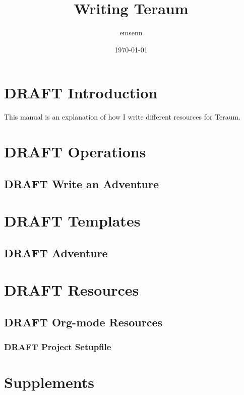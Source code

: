 \documentclass[11pt]{article}
\author{emsenn}
\date{\today}
\title{Writing Teraum}
\begin{document}
\maketitle
\begin{basic-config}
\end{basic-config}
\begin{export-options}
\end{export-options}
\begin{macros}
\end{macros}
\setcounter{tocdepth}{1}
\tableofcontents
{}
\section*{{\bfseries\sffamily DRAFT} Introduction}
\label{sec:org0ef1888}
This manual is an explanation of how I write different
resources for Teraum.
\section*{{\bfseries\sffamily DRAFT} Operations}
\label{sec:org59ce58a}
\subsection*{{\bfseries\sffamily DRAFT} Write an Adventure}
\label{sec:org27db6bd}
\section*{{\bfseries\sffamily DRAFT} Templates}
\label{sec:org3cf9a56}
\subsection*{{\bfseries\sffamily DRAFT} Adventure}
\label{sec:org5ee9cf9}
\section*{{\bfseries\sffamily DRAFT} Resources}
\label{sec:org36d332d}
\subsection*{{\bfseries\sffamily DRAFT} Org-mode Resources}
\label{sec:orgbbd70fe}
\subsubsection*{{\bfseries\sffamily DRAFT} Project Setupfile}
\label{sec:org6a85096}
\section*{Supplements}
\label{sec:orga047be7}
\end{document}
